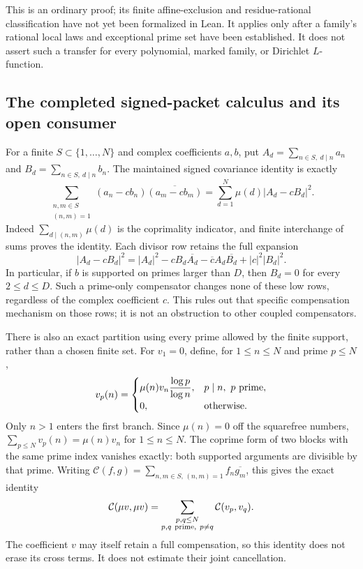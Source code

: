 \documentclass[11pt]{article}
\theoremstyle{definition}
\begin{document}
This is an ordinary proof; its finite affine-exclusion and
residue-rational classification have not yet been formalized in Lean.
It applies only after a family's rational local laws and exceptional
prime set have been established. It does not assert such a transfer
for every polynomial, marked family, or Dirichlet $L$-function.

\subsection{The completed signed-packet calculus and its open consumer}

For a finite $S\subset\{1,\ldots,N\}$ and complex coefficients $a,b$,
put $A_d=\sum_{n\in S,\ d\mid n}a_n$ and
$B_d=\sum_{n\in S,\ d\mid n}b_n$.
The maintained signed covariance identity is exactly
\[
 \sum_{\substack{n,m\in S\\(n,m)=1}}
      (a_n-cb_n)\overline{(a_m-cb_m)}
    =\sum_{d=1}^{N}\mu(d)|A_d-cB_d|^2.
\]
Indeed $\sum_{d\mid(n,m)}\mu(d)$ is the coprimality indicator, and
finite interchange of sums proves the identity. Each divisor row
retains the full expansion
\[
 |A_d-cB_d|^2=|A_d|^2
    -cB_d\overline{A_d}-\overline c A_d\overline{B_d}
    +|c|^2|B_d|^2.
\]
In particular, if $b$ is supported on primes larger than $D$, then
$B_d=0$ for every $2\le d\le D$. Such a prime-only compensator changes
none of these low rows, regardless of the complex coefficient $c$.
This rules out that specific compensation mechanism on those rows;
it is not an obstruction to other coupled compensators.

There is also an exact partition using every prime allowed by the
finite support, rather than a chosen finite set. For $v_1=0$, define,
for $1\le n\le N$ and prime $p\le N$,
\[
 v_p(n)=
 \begin{cases}
 \displaystyle\mu(n)v_n\frac{\log p}{\log n},&p\mid n,\ p\ {\rm prime},\\
 0,&\text{otherwise}.
 \end{cases}
\]
Only $n>1$ enters the first branch. Since $\mu(n)=0$ off the
squarefree numbers, $\sum_{p\le N}v_p(n)=\mu(n)v_n$ for
$1\le n\le N$. The coprime form of two blocks with the same prime
index vanishes exactly: both supported arguments are divisible by
that prime. Writing $\mathcal C(f,g)=\sum_{n,m\in S,\,(n,m)=1}f_n\overline{g_m}$,
this gives the exact identity
\[
 \mathcal C(\mu v,\mu v)=
 \sum_{\substack{p,q\le N\\p,q\ {\rm prime},\ p\ne q}}
            \mathcal C(v_p,v_q).
\]
The coefficient $v$ may itself retain a full compensation, so this
identity does not erase its cross terms. It does not estimate their
joint cancellation.
\end{document}

